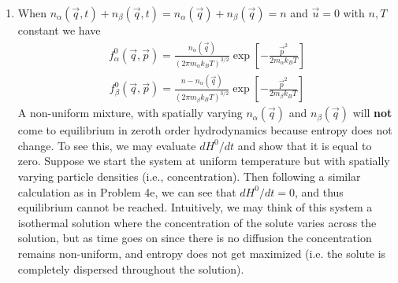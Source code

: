 \documentclass{article}
\theoremstyle{definition}
\newcommand{\al}{\alpha}
\newcommand{\be}{\beta}
\newcommand{\f}[2]{\frac{#1}{#2}}
\newcommand{\lb}{\left[}
\newcommand{\rb}{\right]}
\begin{document}
\begin{enumerate}[label=(\alph*)]
	
	\item When $n_\al(\vec{q},t)+n_\be(\vec{q},t) = n_\al(\vec{q}) + n_\be(\vec{q}) = n$ and $\vec{u}=0$ with $n,T$ constant we have
	\begin{align*}
	\boxed{f_\al^0(\vec{q},\vec{p}) = \f{n_\al(\vec{q})}{(2\pi m_\al k_B T)^{3/2}} \exp\lb -\f{\vec{p}^2}{2m_\al k_B T} \rb}
	\end{align*}
	\begin{align*}
	\boxed{f_\be^0(\vec{q},\vec{p}) = \f{ n- n_\al(\vec{q})}{(2\pi m_\be k_B T)^{3/2}} \exp\lb -\f{\vec{p}^2}{2m_\be k_B T} \rb}
	\end{align*}
	A non-uniform mixture, with spatially varying $n_\al(\vec{q})$ and $n_\be(\vec{q})$ will \textbf{not} come to equilibrium in zeroth order hydrodynamics because entropy does not change. To see this, we may evaluate $dH^0/dt$ and show that it is equal to zero. Suppose we start the system at uniform temperature but with spatially varying particle densities (i.e., concentration). Then following a similar calculation as in Problem 4e, we can see that $dH^0 / dt= 0 $, and thus equilibrium cannot be reached. Intuitively, we may think of this system a isothermal solution where the concentration of the solute varies across the solution, but as time goes on since there is no diffusion the concentration remains non-uniform, and entropy does not get maximized (i.e. the solute is completely dispersed throughout the solution). 
	
	
	

\end{enumerate}
\end{document}
